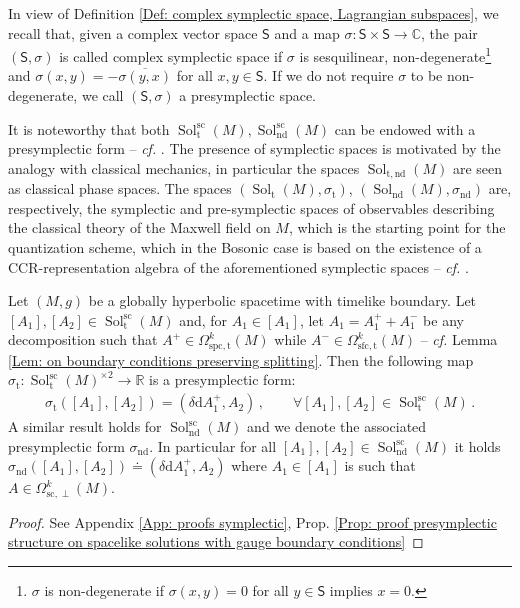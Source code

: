 In view of Definition \ref{Def: complex symplectic space, Lagrangian subspaces}, we recall that, given a complex vector space $\mathsf{S}$ and a map $\sigma\colon\mathsf{S}\times\mathsf{S}\to\mathbb{C}$, the pair $(\mathsf{S},\sigma)$ is called complex symplectic space if $\sigma$ is sesquilinear,  non-degenerate\footnote{$\sigma$ is non-degenerate if $\sigma(x,y)=0$ for all $y\in\mathsf{S}$ implies $x=0$.} and $\sigma(x,y)=-\overline{\sigma(y,x)}$ for all $x,y\in\mathsf{S}$. If we do not require $\sigma$ to be non-degenerate, we call $(\mathsf{S},\sigma)$ a presymplectic space.




It is noteworthy that both $\operatorname{Sol}_{\mathrm{t}}^{\mathrm{sc}}(M), \operatorname{Sol}^{\mathrm{sc}}_{\mathrm{nd}}(M)$ can be endowed with a presymplectic form -- \textit{cf.} \cite[Prop. 5.1]{Hack-Schenkel-13}.
The presence of symplectic spaces is motivated by the analogy with classical mechanics, in particular the spaces $\operatorname{Sol}_{\mathrm{t},\mathrm{nd}}(M)$ are seen as classical phase spaces.
The spaces $(\operatorname{Sol}_{\mathrm{t}}(M),\sigma_{\mathrm{t}})$, $(\operatorname{Sol}_{\mathrm{nd}}(M),\sigma_{\mathrm{nd}})$ are, respectively, the symplectic and pre-symplectic spaces of observables describing the classical theory of the Maxwell field on $M$, which is the starting point for the quantization scheme, which in the Bosonic case is based on the existence of a CCR-representation algebra of the aforementioned symplectic spaces -- \textit{cf.} \cite[Def. 4.3]{Hack-Schenkel-13}.

\begin{proposition}\label{Prop: presymplectic structure on spacelike solutions with gauge boundary conditions}
	Let $(M,g)$ be a globally hyperbolic spacetime with timelike boundary.
	Let $[A_1],[A_2]\in\operatorname{Sol}_{\mathrm{t}}^{\mathrm{sc}}(M)$ and, for $A_1\in[A_1]$, let $A_1=A_1^++A_1^-$ be any decomposition such that $A^+\in\Omega_{\mathrm{spc,t}}^k(M)$ while $A^-\in\Omega_{\mathrm{sfc,t}}^k(M)$
	-- \textit{cf.} Lemma \ref{Lem: on boundary conditions preserving splitting}.
	Then the following map $\sigma_{\mathrm{t}}\colon\operatorname{Sol}_{\mathrm{t}}^{\mathrm{sc}}(M)^{\times 2}\to\mathbb{R}$ is a presymplectic form:
	\begin{align}\label{Eqn: presymplectic structure on solutions with gauge boundary conditions}
	\sigma_{\mathrm{t}}([A_1],[A_2])=
	(\delta\mathrm{d}A_1^+,A_2)\,,\qquad
	\forall [A_1],[A_2]\in\operatorname{Sol}_{\mathrm{t}}^{\mathrm{sc}}(M)\,.
	\end{align}
	A similar result holds for $\operatorname{Sol}_{\mathrm{nd}}^{\mathrm{sc}}(M)$ and we denote the associated presymplectic form $\sigma_{\mathrm{nd}}$.
	In particular for all $[A_1],[A_2]\in\operatorname{Sol}_{\mathrm{nd}}^{\mathrm{sc}}(M)$ it holds $\sigma_{\mathrm{nd}}([A_1],[A_2])\doteq(\delta\mathrm{d}A_1^+,A_2)$ where $A_1\in[A_1]$ is such that $A\in\Omega^k_{\mathrm{sc},\perp}(M)$.
\end{proposition}
\begin{proof}
	See Appendix \ref{App: proofs symplectic}, Prop. \ref{Prop: proof presymplectic structure on spacelike solutions with gauge boundary conditions}
\end{proof}


